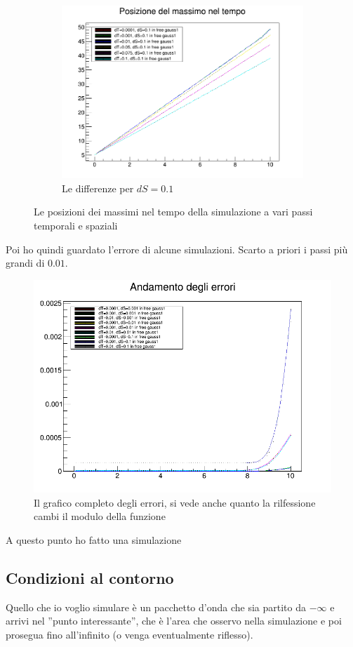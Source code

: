 \begin{figure}
\begin{subfigure}[b]{0.5\textwidth}
\includegraphics[width=\textwidth]{IMG/v_g1_01}
\caption[Differenze in 0.1]{Le differenze per $dS = 0.1$}
\end{subfigure}
\caption{Le posizioni dei massimi nel tempo della simulazione a vari passi temporali  e spaziali}
\end{figure}

Poi ho quindi guardato l'errore di alcune simulazioni. Scarto a priori i passi pi\`u grandi di $0.01$.

\begin{figure}
\centering
\includegraphics[width=0.7\linewidth]{IMG/e_g1full}
\caption[Errori completo]{Il grafico completo degli errori, si vede anche quanto la rilfessione cambi il modulo della funzione}
\label{fig:fullErr}
\end{figure}

A questo punto ho fatto una simulazione 

\subsection{Condizioni al contorno}
Quello che io voglio simulare \`e un pacchetto d'onda che sia partito da $-\infty$ e arrivi nel ''punto interessante'', che \`e l'area che osservo nella simulazione e poi prosegua fino all'infinito (o venga eventualmente riflesso).

